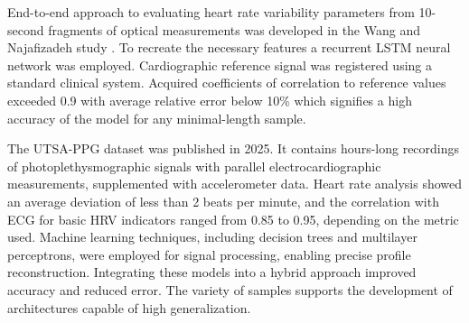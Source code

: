 \documentclass[journal]{IEEEtran}
\begin{document}
End-to-end approach to evaluating heart rate variability parameters from 10-second fragments of optical measurements was developed in the Wang and Najafizadeh study \cite{17}. To recreate the necessary features a recurrent LSTM neural network was employed. Cardiographic reference signal was registered using a standard clinical system. Acquired coefficients of correlation to reference values exceeded 0.9 with average relative error below 10\% which signifies a high accuracy of the model for any minimal-length sample.

The UTSA-PPG dataset \cite{18} was published in 2025. It contains hours-long recordings of photoplethysmographic signals with parallel electrocardiographic measurements, supplemented with accelerometer data. Heart rate analysis showed an average deviation of less than 2 beats per minute, and the correlation with ECG for basic HRV indicators ranged from 0.85 to 0.95, depending on the metric used. Machine learning techniques, including decision trees and multilayer perceptrons, were employed for signal processing, enabling precise profile reconstruction. Integrating these models into a hybrid approach improved accuracy and reduced error. The variety of samples supports the development of architectures capable of high generalization.
\end{document}
